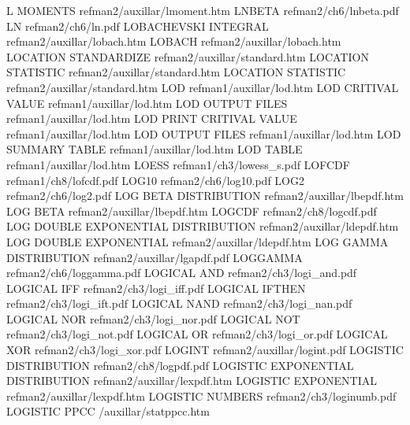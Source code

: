 L MOMENTS                               refman2/auxillar/lmoment.htm
LNBETA                                  refman2/ch6/lnbeta.pdf
LN                                      refman2/ch6/ln.pdf
LOBACHEVSKI INTEGRAL                    refman2/auxillar/lobach.htm
LOBACH                                  refman2/auxillar/lobach.htm
LOCATION STANDARDIZE                    refman2/auxillar/standard.htm
LOCATION STATISTIC                      refman2/auxillar/standard.htm
LOCATION STATISTIC                      refman2/auxillar/standard.htm
LOD                                     refman1/auxillar/lod.htm
LOD CRITIVAL VALUE                      refman1/auxillar/lod.htm
LOD OUTPUT FILES                        refman1/auxillar/lod.htm
LOD PRINT CRITIVAL VALUE                refman1/auxillar/lod.htm
LOD OUTPUT FILES                        refman1/auxillar/lod.htm
LOD SUMMARY TABLE                       refman1/auxillar/lod.htm
LOD TABLE                               refman1/auxillar/lod.htm
LOESS                                   refman1/ch3/lowess_s.pdf
LOFCDF                                  refman1/ch8/lofcdf.pdf
LOG10                                   refman2/ch6/log10.pdf
LOG2                                    refman2/ch6/log2.pdf
LOG BETA DISTRIBUTION                   refman2/auxillar/lbepdf.htm
LOG BETA                                refman2/auxillar/lbepdf.htm
LOGCDF                                  refman2/ch8/logcdf.pdf
LOG DOUBLE EXPONENTIAL DISTRIBUTION     refman2/auxillar/ldepdf.htm
LOG DOUBLE EXPONENTIAL                  refman2/auxillar/ldepdf.htm
LOG GAMMA DISTRIBUTION                  refman2/auxillar/lgapdf.pdf
LOGGAMMA                                refman2/ch6/loggamma.pdf
LOGICAL AND                             refman2/ch3/logi_and.pdf
LOGICAL IFF                             refman2/ch3/logi_iff.pdf
LOGICAL IFTHEN                          refman2/ch3/logi_ift.pdf
LOGICAL NAND                            refman2/ch3/logi_nan.pdf
LOGICAL NOR                             refman2/ch3/logi_nor.pdf
LOGICAL NOT                             refman2/ch3/logi_not.pdf
LOGICAL OR                              refman2/ch3/logi_or.pdf
LOGICAL XOR                             refman2/ch3/logi_xor.pdf
LOGINT                                  refman2/auxillar/logint.pdf
LOGISTIC DISTRIBUTION                   refman2/ch8/logpdf.pdf
LOGISTIC EXPONENTIAL DISTRIBUTION       refman2/auxillar/lexpdf.htm
LOGISTIC EXPONENTIAL                    refman2/auxillar/lexpdf.htm
LOGISTIC NUMBERS                        refman2/ch3/loginumb.pdf
LOGISTIC PPCC                           /auxillar/statppcc.htm
